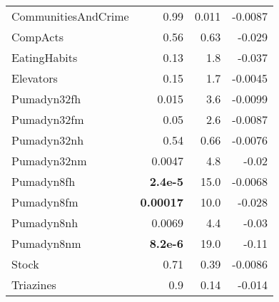 \begin{tabular}{lrrr}
	CommunitiesAndCrime & 0.99                           & 0.011                         & -0.0087                              \\
	CompActs            & 0.56                           & 0.63                          & -0.029                               \\
	\addlinespace
	EatingHabits        & 0.13                           & 1.8                           & -0.037                               \\
	Elevators           & 0.15                           & 1.7                           & -0.0045                              \\
	Pumadyn32fh         & 0.015                          & 3.6                           & -0.0099                              \\
	Pumadyn32fm         & 0.05                           & 2.6                           & -0.0087                              \\
	Pumadyn32nh         & 0.54                           & 0.66                          & -0.0076                              \\
	\addlinespace
	Pumadyn32nm         & 0.0047                         & 4.8                           & -0.02                                \\
	Pumadyn8fh          & \textbf{2.4e-5}                & 15.0                          & -0.0068                              \\
	Pumadyn8fm          & \textbf{0.00017}               & 10.0                          & -0.028                               \\
	Pumadyn8nh          & 0.0069                         & 4.4                           & -0.03                                \\
	Pumadyn8nm          & \textbf{8.2e-6}                & 19.0                          & -0.11                                \\
	\addlinespace
	Stock               & 0.71                           & 0.39                          & -0.0086                              \\
	Triazines           & 0.9                            & 0.14                          & -0.014                               \\\bottomrule
\end{tabular}
